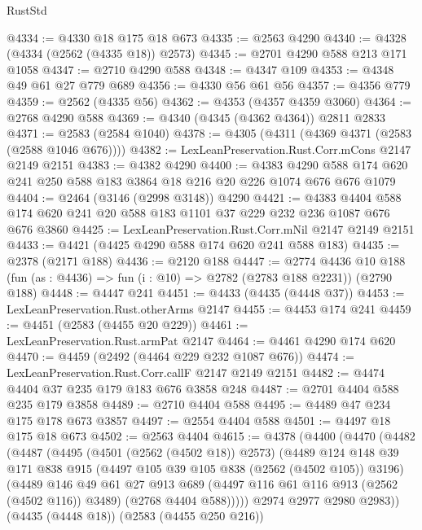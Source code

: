 \begin{lexlean}{RustStd}
\begin{coremodule}
{\begin{coremodule}
{{{{{{{{{{{{{{{@4334 := @4330 @18 @175 @18 @673
@4335 := @2563 @4290
@4340 := @4328 (@4334 (@2562 (@4335 @18)) @2573)
@4345 := @2701 @4290 @588 @213 @171 @1058
@4347 := @2710 @4290 @588
@4348 := @4347 @109
@4353 := @4348 @49 @61 @27 @779 @689
@4356 := @4330 @56 @61 @56
@4357 := @4356 @779
@4359 := @2562 (@4335 @56)
@4362 := @4353 (@4357 @4359 @3060)
@4364 := @2768 @4290 @588
@4369 := @4340 (@4345 (@4362 @4364)) @2811 @2833
@4371 := @2583 (@2584 @1040)
@4378 := @4305 (@4311 (@4369 @4371 (@2583 (@2588 @1046 @676))))
@4382 := LexLeanPreservation.Rust.Corr.mCons @2147 @2149 @2151
@4383 := @4382 @4290
@4400 := @4383
    @4290
    @588
    @174
    @620
    @241
    @250
    @588
    @183
    @3864
    @18
    @216
    @20
    @226
    @1074
    @676
    @676
    @1079
@4404 := @2464 (@3146 (@2998 @3148)) @4290
@4421 := @4383
    @4404
    @588
    @174
    @620
    @241
    @20
    @588
    @183
    @1101
    @37
    @229
    @232
    @236
    @1087
    @676
    @676
    @3860
@4425 := LexLeanPreservation.Rust.Corr.mNil @2147 @2149 @2151
@4433 := @4421 (@4425 @4290 @588 @174 @620 @241 @588 @183)
@4435 := @2378 (@2171 @188)
@4436 := @2120 @188
@4447 := @2774
    @4436
    @10
    @188
    (fun (as : @4436) => fun (i : @10) => @2782 (@2783 @188 @2231))
    (@2790 @188)
@4448 := @4447 @241
@4451 := @4433 (@4435 (@4448 @37))
@4453 := LexLeanPreservation.Rust.otherArms @2147
@4455 := @4453 @174 @241
@4459 := @4451 (@2583 (@4455 @20 @229))
@4461 := LexLeanPreservation.Rust.armPat @2147
@4464 := @4461 @4290 @174 @620
@4470 := @4459 (@2492 (@4464 @229 @232 @1087 @676))
@4474 := LexLeanPreservation.Rust.Corr.callF @2147 @2149 @2151
@4482 := @4474 @4404 @37 @235 @179 @183 @676 @3858 @248
@4487 := @2701 @4404 @588 @235 @179 @3858
@4489 := @2710 @4404 @588
@4495 := @4489 @47 @234 @175 @178 @673 @3857
@4497 := @2554 @4404 @588
@4501 := @4497 @18 @175 @18 @673
@4502 := @2563 @4404
@4615 := @4378
    (@4400
      (@4470
        (@4482
          (@4487
            (@4495
              (@4501 (@2562 (@4502 @18)) @2573)
              (@4489
                @124
                @148
                @39
                @171
                @838
                @915
                (@4497 @105 @39 @105 @838 (@2562 (@4502 @105)) @3196)
                (@4489
                  @146
                  @49
                  @61
                  @27
                  @913
                  @689
                  (@4497 @116 @61 @116 @913 (@2562 (@4502 @116)) @3489)
                  (@2768 @4404 @588)))))
          @2974
          @2977
          @2980
          @2983))
      (@4435 (@4448 @18))
      (@2583 (@4455 @250 @216))
}}}}}}}}}}}}}}}
\end{coremodule}}
\end{coremodule}
\end{lexlean}
